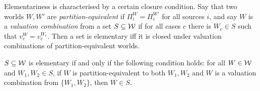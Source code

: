 
Elementariness is characterised by a certain closure condition. Say that two
worlds $W, W'$ are \emph{partition-equivalent} if $\Pi^W_i = \Pi^{W'}_i$ for
all sources $i$, and say $W$ is a \emph{valuation combination} from a set $S
\subseteq \mathcal{W}$ if for all cases $c$ there is $W_c \in S$ such that $v^W_c =
v^{W_c}_c$.  Then a set is elementary iff it is closed under valuation
combinations of partition-equivalent worlds.

\begin{proposition}
\label{kr_prop_elementary_characterisation}
    $S \subseteq \mathcal{W}$ is elementary if and only if the following condition
    holds: for all $W \in \mathcal{W}$ and $W_1, W_2 \in S$, if $W$ is
    partition-equivalent to both $W_1, W_2$ and $W$ is a valuation combination
    from $\{W_1, W_2\}$, then $W \in S$.
\end{proposition}

